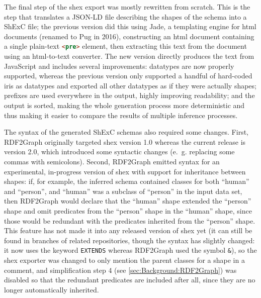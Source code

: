 The final step of the \gls{shex} export was mostly rewritten from scratch.
This is the step that translates a JSON-LD file describing the shapes of the schema
into a ShExC file;
the previous version did this using Jade,
a templating engine for \gls{html} documents (renamed to Pug in 2016),
constructing an \gls{html} document containing a single plain-text \lstinline[language=html]{<pre>} element,
then extracting this text from the document using an \gls{html}-to-text converter.
The new version directly produces the text from JavaScript
and includes several improvements:
datatypes are now properly supported,
whereas the previous version only supported a handful of hard-coded \glspl{iri} as datatypes
and exported all other datatypes as if they were actually \glspl{shape};
prefixes are used everywhere in the output, highly improving readability;
and the output is sorted, making the whole generation process more deterministic
and thus making it easier to compare the results of multiple inference processes.

The syntax of the generated ShExC \glspl{schema} %
also required some changes.
First, \gls{RDF2Graph} originally targeted \gls{shex} version 1.0
whereas the current release is version 2.0,
which introduced some syntactic changes
(e.~g. replacing some commas with semicolons).
Second, \gls{RDF2Graph} emitted syntax for an experimental, in-progress version of \gls{shex}
with support for inheritance between \glspl{shape}:
if, for example, the inferred \gls{schema} contained classes for both “human” and “person”,
and “human” was a subclass of “person” in the input data set,
then \gls{RDF2Graph} would declare that the “human” \gls{shape} extended the “person” \gls{shape}
and omit \glspl{predicate} from the “person” \gls{shape} in the “human” \gls{shape},
since those would be redundant with the \glspl{predicate} inherited from the “person” \gls{shape}.
This feature has not made it into any released version of \gls{shex} yet
(it can still be found in  branches of related repositories,
though the syntax has slightly changed:
it now uses the keyword \lstinline{EXTENDS} whereas \gls{RDF2Graph} used the symbol \lstinline{&}),
so the \gls{shex} exporter was changed to only mention the parent classes for a \gls{shape} in a comment,
and simplification step 4 (see \cref{sec:Background:RDF2Graph}) was disabled
so that the redundant \glspl{predicate} are included after all,
since they are no longer automatically inherited.

